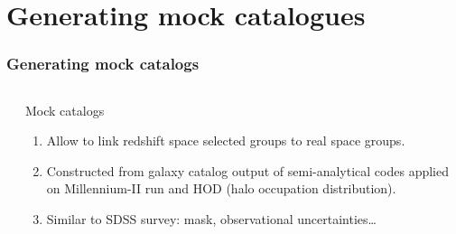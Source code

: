 \section{Generating mock catalogues}
\begin{frame}
    \frametitle{Generating mock catalogs}

    \begin{columns}
        \begin{column}{0.5\textwidth}
        \end{column}
        \begin{column}{0.5\textwidth}
            \begin{alertblock}{Mock catalogs}
                \begin{enumerate}
                    \item<1-> Allow to link redshift space selected groups
                        to real space groups.
                    \item<2-> Constructed from galaxy catalog output of
                        semi-analytical codes applied on Millennium-II run
                        and HOD (halo occupation distribution).
                    \item<3-> Similar to SDSS survey: mask, observational
                        uncertainties\ldots
                \end{enumerate}
            \end{alertblock}
        \end{column}
    \end{columns}
\end{frame}

